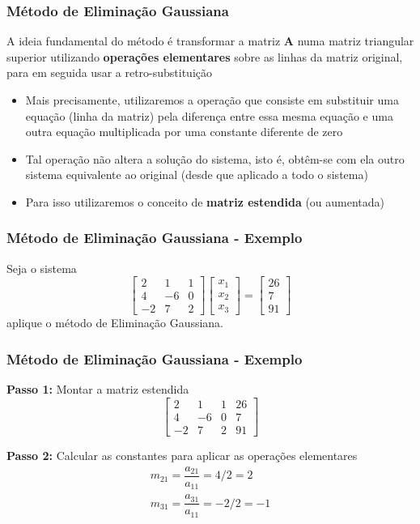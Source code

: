 \documentclass{beamer}
\theoremstyle{mystyle}
\begin{document}
\begin{frame}
	\frametitle{Método de Eliminação Gaussiana}
	 A ideia fundamental do método é transformar a matriz \textbf{A} numa matriz triangular superior utilizando \textbf{operações elementares} sobre as linhas da matriz original, para em seguida usar a retro-substituição
	\begin{itemize}
		\item Mais precisamente, utilizaremos a operação que consiste em substituir uma equação (linha da matriz) pela diferença entre essa mesma equação e uma outra equação multiplicada por uma \alert{constante} diferente de zero
		\item Tal operação não altera a solução do sistema, isto é, obtêm-se com ela outro sistema equivalente ao original (desde que aplicado a todo o sistema)
		\item Para isso utilizaremos o conceito de \textbf{matriz estendida} (ou aumentada)
	\end{itemize}
\end{frame}

\begin{frame}
	\frametitle{Método de Eliminação Gaussiana - Exemplo}
	 Seja o sistema
	 \begin{equation*}
	 	\left[
	 	\begin{array}{ccc}
	 		2 & 1 & 1  \\
	 		4 & -6 & 0  \\
	 		-2 & 7 & 2
	 	\end{array}
	 	\right] 
	 	\begin{bmatrix} x_{1} \\ x_{2} \\ x_{3} \end{bmatrix}
	 	=
	 	\begin{bmatrix} 26 \\ 7 \\ 91 \end{bmatrix}
	\end{equation*}
	aplique o método de Eliminação Gaussiana.

\end{frame}

\begin{frame}
	\frametitle{Método de Eliminação Gaussiana - Exemplo}
	\textbf{Passo 1:} Montar a matriz estendida
	\begin{equation*}
		\left[
		\begin{array}{ccc|c}
			2  & 1  & 1 & 26 \\
			4  & -6 & 0 & 7  \\
			-2 & 7  & 2 & 91
		\end{array}
		\right]
	\end{equation*}

	\textbf{Passo 2:} Calcular as \alert{constantes} para aplicar as operações elementares
	\begin{gather*}
		m_{21} = \dfrac{a_{21}}{a_{11}} = 4/2 = 2\\
		m_{31} = \dfrac{a_{31}}{a_{11}} = -2/2 = -1
	\end{gather*}
\end{frame}
\end{document}
